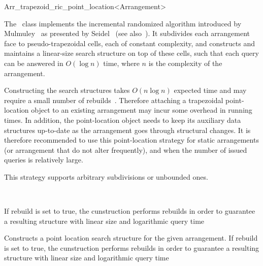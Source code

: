 
\ccRefPageBegin

\begin{ccRefClass}{Arr_trapezoid_ric_point_location<Arrangement>}
\label{arr_ref:trap_pl}

\ccDefinition

The \ccRefName\ class implements the incremental randomized algorithm
introduced by Mulmuley~\cite{m-fppa-90} as presented by
Seidel~\cite{s-sfira-91} (see also~\cite[Chapter~6]{bkos-cgaa-00}).
It subdivides each arrangement face to pseudo-trapezoidal cells, each
of constant complexity, and constructs and maintains a linear-size search
structure on top of these cells, such that each query can be answered
in $O(\log n)$ time, where $n$ is the complexity of the arrangement.

Constructing the search structures takes $O(n \log n)$ expected time 
and may require a small number of rebuilds~\cite{hkh-iiplgtds-12}. Therefore
attaching a trapezoidal point-location object to an existing arrangement
may incur some overhead in running times. In addition, the point-location
object needs to keep its auxiliary data structures up-to-date as the
arrangement goes through structural changes. It is therefore recommended
to use this point-location strategy for static arrangements (or arrangement
that do not alter frequently), and when the number of issued queries
is relatively large.

This strategy supports arbitrary subdivisions or unbounded ones.


\ccIsModel
   \\

\ccCreation
{}

    {If rebuild is set to true, the cunstruction performs rebuilds in order to guarantee a resulting structure with linear size and logarithmic query time}

    {Constructs a point location search structure for the given arrangement. If rebuild is set to true, the cunstruction performs rebuilds in order to guarantee a resulting structure with linear size and logarithmic query time}


\end{ccRefClass}
